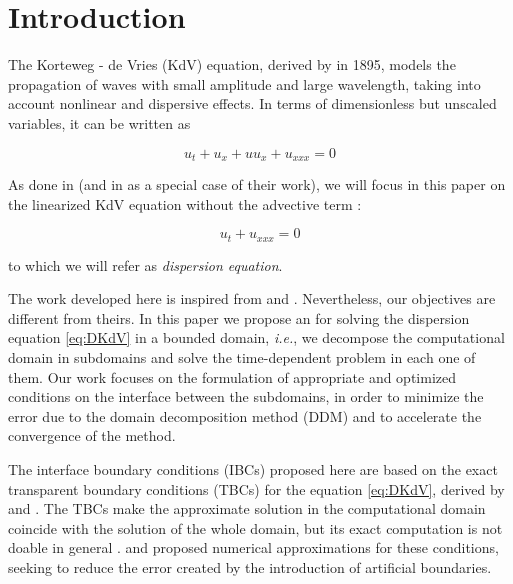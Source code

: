 \section{Introduction}

\indent The Korteweg - de Vries (KdV) equation, derived by \cite{kdv1895} in 1895, models the propagation of waves with small amplitude and large wavelength, taking into account nonlinear and dispersive effects. In terms of dimensionless but unscaled variables, it can be written as \cite{BBM1971}

\begin{equation*}
	u_t + u_x + uu_x + u_{xxx} = 0
\end{equation*}

\indent As done in \cite{zheng2008} (and in \cite{besse2015} as a special case of their work), we will focus in this paper on the linearized KdV equation without the advective term : 

\begin{equation}
 \label{eq:DKdV}
	u_t  + u_{xxx} = 0
\end{equation}

\noindent to which we will refer as \emph{dispersion equation}.

\indent The work developed here is inspired from \cite{zheng2008} and \cite{besse2015}. Nevertheless, our objectives are different from theirs. In this paper we propose an  for solving the dispersion equation \eqref{eq:DKdV} in a bounded domain, \emph{i.e.}, we decompose the computational domain in subdomains and solve the time-dependent problem in each one of them. Our work focuses on the formulation of appropriate and optimized conditions on the interface between the subdomains, in order to minimize the error due to the domain decomposition method (DDM) and to accelerate the convergence of the method.

\indent The interface boundary conditions (IBCs) proposed here are based on the exact transparent boundary conditions (TBCs) for the equation \eqref{eq:DKdV}, derived by \cite{zheng2008} and \cite{besse2015}. The TBCs make the approximate solution in the computational domain coincide with the solution of the whole domain, but its exact computation is not doable in general \cite{Xavieretal2008}. \cite{zheng2008} and \cite{besse2015} proposed numerical approximations for these conditions, seeking to reduce the error created by the introduction of artificial boundaries.

